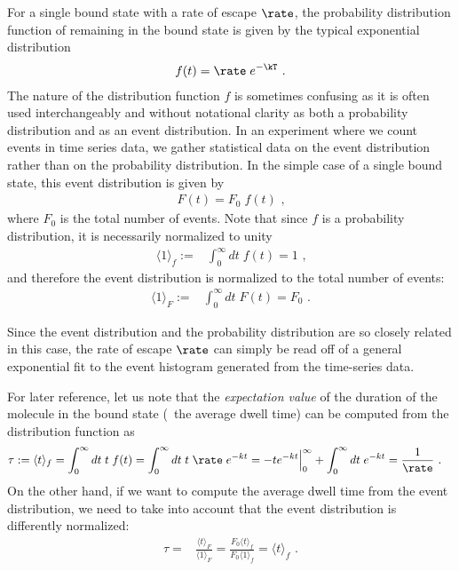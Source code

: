 For a single bound state with a rate of escape $\rate$, the probability distribution function of remaining in
the bound state is given by the typical exponential distribution
%
\begin{align*}
    f(t) = \rate \; e^{-\kT}
    \text{ .}
\end{align*}
%
The nature of the distribution function $f$ is sometimes confusing as it is often used interchangeably and
without notational clarity as both a probability distribution and as an event distribution. In an experiment
where we count events in time series data, we gather statistical data on the event distribution rather than on
the probability distribution. In the simple case of a single bound state, this event distribution is given by
%
\begin{align}\label{eq:event_distri}
    F(t) = F_0 \;f(t)
    \text{ ,}
\end{align}
%
where $F_0$ is the total number of events. Note that since $f$ is a probability distribution, it is
necessarily normalized to unity
%
\begin{align}
    \langle 1\rangle_f :={}& \int_0^\infty dt\;f(t) = 1
    \text{ ,}
\end{align}
%
and therefore the event distribution is normalized to the total number of events:
%
\begin{align}\label{eq:normalization}
    \langle 1\rangle_F :={}& \int_0^\infty dt\;F(t) = F_0
    \text{ .}
\end{align}
%

Since the event distribution and the probability distribution are so closely related in this case, the rate of
escape $\rate$ can simply be read off of a general exponential fit to the event histogram generated from the
time-series data.

For later reference, let us note that the \emph{expectation value} of the duration of the molecule in the
bound state (\ie~the average dwell time) can be computed from the distribution function as
%
\begin{align*}
    \tau :={}& \langle t\rangle_f
    = \int_0^\infty dt\; t\; f(t)
    = \int_0^\infty dt\; t\;\rate\; e^{-kt}
    = - t e^{-kt}\Big|_{0}^\infty + \int_0^\infty dt \;e^{-kt}
    = \frac{1}{\rate}
    \text{ .}
\end{align*}
%
On the other hand, if we want to compute the average dwell time from the event distribution, we need to take
into account that the event distribution is differently normalized:
%
\begin{align}\label{eq:event_distri_norm}
    \tau ={}& \frac{\langle t\rangle_F}{\langle 1\rangle_F}
    = \frac{F_0\langle t\rangle_f}{F_0\langle 1\rangle_f}
    = \langle t\rangle_f
    \text{ .}
\end{align}
%

